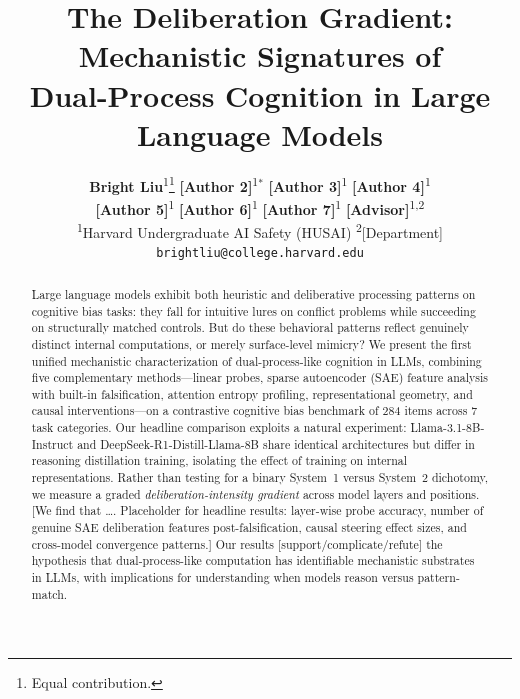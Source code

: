 \documentclass[accepted]{article}
\title{The Deliberation Gradient: Mechanistic Signatures of\\
  Dual-Process Cognition in Large Language Models}
\author{%
  \textbf{Bright Liu}\textsuperscript{1}\thanks{Equal contribution.} \quad
  \textbf{[Author 2]}\textsuperscript{1}$^*$ \quad
  \textbf{[Author 3]}\textsuperscript{1} \quad
  \textbf{[Author 4]}\textsuperscript{1} \\[2pt]
  \textbf{[Author 5]}\textsuperscript{1} \quad
  \textbf{[Author 6]}\textsuperscript{1} \quad
  \textbf{[Author 7]}\textsuperscript{1} \quad
  \textbf{[Advisor]}\textsuperscript{1,2} \\[6pt]
  \textsuperscript{1}Harvard Undergraduate AI Safety (HUSAI) \quad
  \textsuperscript{2}[Department] \\[2pt]
  \texttt{brightliu@college.harvard.edu}
}
\date{}
\begin{document}
\maketitle


\begin{abstract}
Large language models exhibit both heuristic and deliberative processing
patterns on cognitive bias tasks: they fall for intuitive lures on conflict
problems while succeeding on structurally matched controls.  But do these
behavioral patterns reflect genuinely distinct internal computations, or
merely surface-level mimicry?  We present the first unified mechanistic
characterization of dual-process-like cognition in LLMs, combining five
complementary methods---linear probes, sparse autoencoder (SAE) feature
analysis with built-in falsification, attention entropy profiling,
representational geometry, and causal interventions---on a contrastive
cognitive bias benchmark of 284 items across 7 task categories.  Our
headline comparison exploits a natural experiment: Llama-3.1-8B-Instruct
and DeepSeek-R1-Distill-Llama-8B share identical architectures but differ
in reasoning distillation training, isolating the effect of training on
internal representations.  Rather than testing for a binary System~1 versus
System~2 dichotomy, we measure a graded \emph{deliberation-intensity
gradient} across model layers and positions.  [We find that \ldots.
Placeholder for headline results: layer-wise probe accuracy, number of
genuine SAE deliberation features post-falsification, causal steering
effect sizes, and cross-model convergence patterns.]  Our results
[support/complicate/refute] the hypothesis that dual-process-like
computation has identifiable mechanistic substrates in LLMs, with
implications for understanding when models reason versus pattern-match.
\end{abstract}

\end{document}
